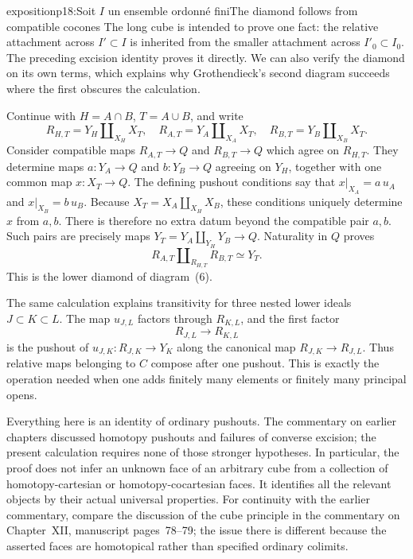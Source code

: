 \begin{dcomment}{exposition}{p18:Soit $I$ un ensemble ordonné fini}{The diamond follows from compatible cocones}
The long cube is intended to prove one fact: the relative attachment across $I'\subset I$ is inherited from the smaller attachment across $I'_0\subset I_0$. The preceding excision identity proves it directly. We can also verify the diamond on its own terms, which explains why Grothendieck's second diagram succeeds where the first obscures the calculation.

Continue with $H=A\cap B$, $T=A\cup B$, and write
\[
 R_{H,T}=Y_H\amalg_{X_H}X_T,
 \quad R_{A,T}=Y_A\amalg_{X_A}X_T,
 \quad R_{B,T}=Y_B\amalg_{X_B}X_T.
\]
Consider compatible maps $R_{A,T}\to Q$ and $R_{B,T}\to Q$ which agree on $R_{H,T}$. They determine maps $a:Y_A\to Q$ and $b:Y_B\to Q$ agreeing on $Y_H$, together with one common map $x:X_T\to Q$. The defining pushout conditions say that $x|_{X_A}=a\,u_A$ and $x|_{X_B}=b\,u_B$. Because $X_T=X_A\amalg_{X_H}X_B$, these conditions uniquely determine $x$ from $a,b$. There is therefore no extra datum beyond the compatible pair $a,b$. Such pairs are precisely maps $Y_T=Y_A\amalg_{Y_H}Y_B\to Q$. Naturality in $Q$ proves
\[
 R_{A,T}\amalg_{R_{H,T}}R_{B,T}\simeq Y_T.
\]
This is the lower diamond of diagram~(6).

The same calculation explains transitivity for three nested lower ideals $J\subset K\subset L$. The map $u_{J,L}$ factors through $R_{K,L}$, and the first factor
\[
 R_{J,L}\longrightarrow R_{K,L}
\]
is the pushout of $u_{J,K}:R_{J,K}\to Y_K$ along the canonical map $R_{J,K}\to R_{J,L}$. Thus relative maps belonging to $C$ compose after one pushout. This is exactly the operation needed when one adds finitely many elements or finitely many principal opens.

Everything here is an identity of ordinary pushouts. The commentary on earlier chapters discussed homotopy pushouts and failures of converse excision; the present calculation requires none of those stronger hypotheses. In particular, the proof does not infer an unknown face of an arbitrary cube from a collection of homotopy-cartesian or homotopy-cocartesian faces. It identifies all the relevant objects by their actual universal properties. For continuity with the earlier commentary, compare the discussion of the cube principle in the commentary on Chapter~XII, manuscript pages~78--79; the issue there is different because the asserted faces are homotopical rather than specified ordinary colimits.
\end{dcomment}

